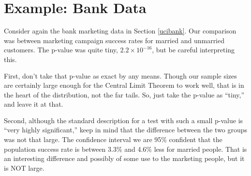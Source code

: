% 
% 
% 
% 
% 

\section{Example:  Bank Data}

Consider again the bank marketing data in Section \ref{ucibank}.
Our comparison was between marketing campaign success rates for married
and unmarried customers.  The p-value was quite tiny, $2.2 \times
10^{-16}$, but be careful interpreting this.

First, don't take that p-value as exact by any means.  Though our sample
sizes are certainly large enough for the Central Limit Theorem to work
well, that is in the heart of the distribution, not the far tails.  So,
just take the p-value as ``tiny,'' and leave it at that.

Second, although the standard description for a test with such a small
p-value is ``very highly significant,'' keep in mind that the difference
between the two groups was not that large.  The confidence interval we
are 95\% confident that the population success rate is between 3.3\% and
4.6\% less for married people.  That is an interesting difference and
possibly of some use to the marketing people, but it is NOT large.

